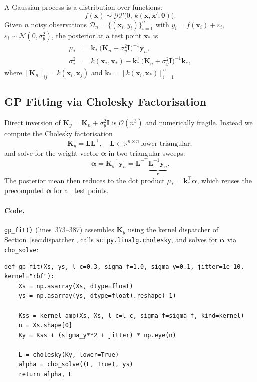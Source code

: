 \documentclass[11pt,a4paper]{article}
\newcommand{\bx}{\bm{x}}
\newcommand{\by}{\bm{y}}
\newcommand{\bK}{\bm{K}}
\newcommand{\bL}{\bm{L}}
\newcommand{\balpha}{\bm{\alpha}}
\newcommand{\btheta}{\bm{\theta}}
\newcommand{\R}{\mathbb{R}}
\newcommand{\N}{\mathcal{N}}
\newcommand{\GP}{\mathcal{GP}}
\theoremstyle{remark}
\newcommand{\codefile}[1]{\texttt{#1}}
\newcommand{\coderange}[2]{lines~#1--#2}
\newcommand{\codefn}[1]{\texttt{#1()}}
\begin{document}
A Gaussian process is a distribution over functions:
\[
  f(\bx) \sim \GP\!\bigl(0,\, k(\bx,\bx';\btheta)\bigr).
\]
Given $n$ noisy observations $\mathcal{D}_n = \{(\bx_i, y_i)\}_{i=1}^n$
with $y_i = f(\bx_i)+\varepsilon_i$, $\varepsilon_i\sim\N(0,\sigma_y^2)$,
the posterior at a test point $\bx_*$ is
\begin{align}
  \mu_*      &= \bm{k}_*^\top \bigl(\bK_n + \sigma_y^2 \bm{I}\bigr)^{-1} \by_n, \\
  \sigma_*^2 &= k(\bx_*,\bx_*) - \bm{k}_*^\top \bigl(\bK_n + \sigma_y^2 \bm{I}\bigr)^{-1} \bm{k}_*,
\end{align}
where $[\bK_n]_{ij} = k(\bx_i,\bx_j)$ and
$\bm{k}_* = [k(\bx_i,\bx_*)]_{i=1}^n$.

\subsection{GP Fitting via Cholesky Factorisation}
\label{sec:gpfit}

Direct inversion of $\bm{K}_y = \bK_n + \sigma_y^2\bm{I}$ is $\mathcal{O}(n^3)$
and numerically fragile.  Instead we compute the Cholesky factorisation
\begin{equation}
  \bm{K}_y = \bL\bL^\top,
  \quad \bL \in \R^{n\times n}\ \text{lower triangular},
\end{equation}
and solve for the weight vector $\balpha$ in two triangular sweeps:
\begin{equation}
  \balpha = \bm{K}_y^{-1}\by_n
          = \bL^{-\top}\!\underbrace{\bL^{-1}\by_n}_{\bm{v}}.
\end{equation}
The posterior mean then reduces to the dot product $\mu_* = \bm{k}_*^\top\balpha$,
which reuses the precomputed $\balpha$ for all test points.

\paragraph{Code.}
\codefn{gp\_fit} (\coderange{373}{387}) assembles $\bm{K}_y$ using the
kernel dispatcher of Section~\ref{sec:dispatcher}, calls
\texttt{scipy.linalg.cholesky}, and solves for $\balpha$ via
\texttt{cho\_solve}:

\begin{lstlisting}[firstnumber=373, caption=\codefn{gp\_fit} in \codefile{BO\_ML4F.py}]
def gp_fit(Xs, ys, l_c=0.3, sigma_f=1.0, sigma_y=0.1, jitter=1e-10, kernel="rbf"):
    Xs = np.asarray(Xs, dtype=float)
    ys = np.asarray(ys, dtype=float).reshape(-1)

    Kss = kernel_amp(Xs, Xs, l_c=l_c, sigma_f=sigma_f, kind=kernel)
    n = Xs.shape[0]
    Ky = Kss + (sigma_y**2 + jitter) * np.eye(n)

    L = cholesky(Ky, lower=True)
    alpha = cho_solve((L, True), ys)
    return alpha, L
\end{lstlisting}
\end{document}
